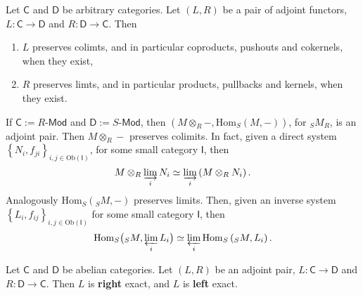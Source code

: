 \begin{prop}
	Let $\mathsf{C}$ and $\mathsf{D}$ be arbitrary categories.
	Let $\left(L, R\right)$ be a pair of adjoint functors, $L: \mathsf{C} \to \mathsf{D}$ and
	$R: \mathsf{D} \to \mathsf{C}$.
	Then
	\begin{enumerate}
		\item $L$ preserves colimts, and in particular coproducts, pushouts and cokernels,
			when they exist,
		\item $R$ preserves limts, and in particular products, pullbacks and kernels,
			when they exist.
	\end{enumerate}
\end{prop} 

\begin{ex}
	If $\mathsf{C} := R\text{-}\mathsf{Mod}$ and $\mathsf{D}:= S\text{-}\mathsf{Mod}$, then
	$\left(M \otimes_R -, \mathrm{Hom}_{S}\left( M, - \right)\right)$, for ${}_SM_R$, is an adjoint pair.
	Then $M \otimes_R -$ preserves colimits.
	In fact, given a direct system $\left\{N_i, f_{ji}\right\}_{i, j \in \mathrm{Ob} \left(\mathsf{I}\right)}$, 
	for some small category $\mathsf{I}$, then
	\begin{equation}
		M \otimes_R \varinjlim_i N_i \simeq \varinjlim_i \left( M \otimes_R N_i \right)
	.\end{equation} 
	Analogously $\mathrm{Hom}_{S}\left( {}_S M, - \right)$ preserves limits.
	Then, given an inverse system $\left\{ L_i, f_{ij} \right\}_{i,j \in \mathrm{Ob} \left(\mathsf{I}\right)}$
	for some small category $\mathsf{I}$, then
	\begin{equation}
		\mathrm{Hom}_{S}\big( {}_S M, \varprojlim_i L_i \big) \simeq
		\varprojlim_i \mathrm{Hom}_{ S}\left( {}_S M, L_i \right)
	.\end{equation} 
\end{ex} 

\begin{rem}
	Let $\mathsf{C}$ and $\mathsf{D}$ be abelian categories.
	Let $\left(L, R\right)$ be an adjoint pair, $L: \mathsf{C} \to \mathsf{D}$ and $R: \mathsf{D} \to \mathsf{C}$.
	Then $L$ is \textbf{right} exact, and $L$ is \textbf{left} exact.
\end{rem}

